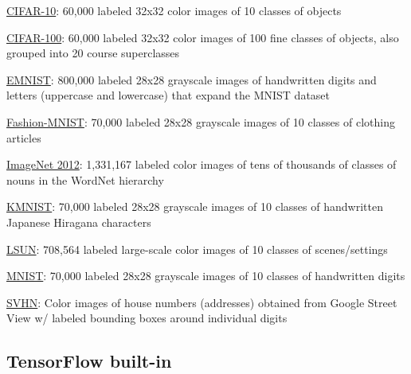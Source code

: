 \documentclass{tufte-handout}
\begin{document}
\bi
\item
  \href{https://pytorch.org/docs/stable/torchvision/datasets.html\#torchvision.datasets.CIFAR10}{CIFAR-10}:
  60,000 labeled 32x32 color images of 10 classes of objects
\item
  \href{https://pytorch.org/docs/stable/torchvision/datasets.html\#torchvision.datasets.CIFAR100}{CIFAR-100}:
  60,000 labeled 32x32 color images of 100 fine classes of objects, also
  grouped into 20 course superclasses
\item
  \href{https://pytorch.org/docs/stable/torchvision/datasets.html\#emnist}{EMNIST}:
  800,000 labeled 28x28 grayscale images of handwritten digits and
  letters (uppercase and lowercase) that expand the MNIST dataset
\item
  \href{https://pytorch.org/docs/stable/torchvision/datasets.html\#fashion-mnist}{Fashion-MNIST}:
  70,000 labeled 28x28 grayscale images of 10 classes of clothing
  articles
\item
  \href{https://pytorch.org/docs/stable/torchvision/datasets.html\#imagenet}{ImageNet
  2012}: 1,331,167 labeled color images of tens of thousands of classes
  of nouns in the WordNet hierarchy
\item
  \href{https://pytorch.org/docs/stable/torchvision/datasets.html\#kmnist}{KMNIST}:
  70,000 labeled 28x28 grayscale images of 10 classes of handwritten
  Japanese Hiragana characters
\item
  \href{https://pytorch.org/docs/stable/torchvision/datasets.html\#lsun}{LSUN}:
  708,564 labeled large-scale color images of 10 classes of
  scenes/settings
\item
  \href{https://pytorch.org/docs/stable/torchvision/datasets.html\#mnist}{MNIST}:
  70,000 labeled 28x28 grayscale images of 10 classes of handwritten
  digits
\item
  \href{https://pytorch.org/docs/stable/torchvision/datasets.html\#svhn}{SVHN}:
  Color images of house numbers (addresses) obtained from Google Street
  View w/ labeled bounding boxes around individual digits
\ei

\subsection*{TensorFlow built-in}\label{tensorflow-built-in-datasets}
\end{document}
